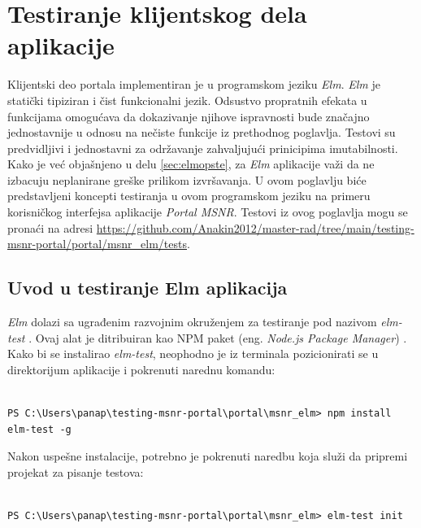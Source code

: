 \documentclass[12pt,oneside]{memoir}
\begin{document}
\chapter{Testiranje klijentskog dela aplikacije}
\label{chp:testiranjeelm}
\par Klijentski deo portala implementiran je u programskom jeziku \emph{Elm}. \emph{Elm} je statički tipiziran i čist funkcionalni jezik. Odsustvo propratnih efekata u funkcijama omogućava da dokazivanje njihove ispravnosti bude značajno jednostavnije u odnosu na nečiste funkcije iz prethodnog poglavlja. Testovi su predvidljivi i jednostavni za održavanje zahvaljujući prinicipima imutabilnosti. Kako je već objašnjeno u delu \ref{sec:elmopste}, za \emph{Elm} aplikacije važi da ne izbacuju neplanirane greške prilikom izvršavanja. U ovom poglavlju biće predstavljeni koncepti testiranja u ovom programskom jeziku na primeru korisničkog interfejsa aplikacije \emph{Portal MSNR}. Testovi iz ovog poglavlja mogu se pronaći na adresi \url{https://github.com/Anakin2012/master-rad/tree/main/testing-msnr-portal/portal/msnr_elm/tests}.

\section{Uvod u testiranje Elm aplikacija}
\label{sec:uvod-elm}

\par \emph{Elm} dolazi sa ugrađenim razvojnim okruženjem za testiranje pod nazivom \emph{elm-test} \cite{elm-test}. Ovaj alat je ditribuiran kao NPM paket (eng. \emph{Node.js Package Manager}) \cite{npm}. Kako bi se instalirao \emph{elm-test}, neophodno je iz terminala pozicionirati se u direktorijum aplikacije i pokrenuti narednu komandu: 

\begin{minipage}{\linewidth}
\begin{lstlisting}[style=DOS]

PS C:\Users\panap\testing-msnr-portal\portal\msnr_elm> npm install elm-test -g

\end{lstlisting}
\end{minipage}

\par Nakon uspešne instalacije, potrebno je pokrenuti naredbu koja služi da pripremi projekat za pisanje testova: 

\begin{minipage}{\linewidth}
\begin{lstlisting}[style=DOS]

PS C:\Users\panap\testing-msnr-portal\portal\msnr_elm> elm-test init

\end{lstlisting}
\end{minipage}
\end{document}
